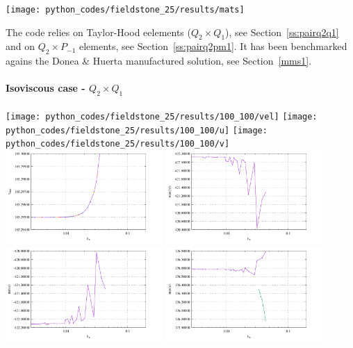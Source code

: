 \begin{center}
\texttt{[image: python\_codes/fieldstone\_25/results/mats]}
\end{center}

The code relies on Taylor-Hood eelements ($Q_2\times Q_1$), see Section~\ref{ss:pairq2q1} and 
on $Q_2\times P_{-1}$ elements, see Section~\ref{ss:pairq2pm1}. 
It has been  benchmarked agains the Donea \& Huerta manufactured solution, see Section~\ref{mms1}.

\newpage
\paragraph{Isoviscous case - $Q_2\times Q_1$}

\begin{center}
\texttt{[image: python\_codes/fieldstone\_25/results/100\_100/vel]}
\texttt{[image: python\_codes/fieldstone\_25/results/100\_100/u]}
\texttt{[image: python\_codes/fieldstone\_25/results/100\_100/v]}\\
\includegraphics[width=6cm]{python_codes/fieldstone_25/results/vrms_100.pdf}
\includegraphics[width=6cm]{python_codes/fieldstone_25/results/max_vel_100.pdf}\\
\includegraphics[width=6cm]{python_codes/fieldstone_25/results/min_u_100.pdf}
\includegraphics[width=6cm]{python_codes/fieldstone_25/results/max_u_100.pdf}\\

\end{center}
